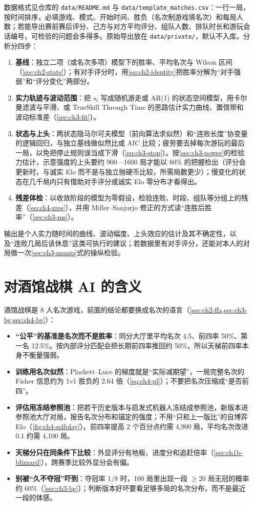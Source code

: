 数据格式见仓库的 \texttt{data/README.md} 与 \texttt{data/template\_matches.csv}：一行一局，按时间排序，必填游戏、模式、开始时间、胜负（名次制游戏填名次）和每局人数；若能导出赛前赛后评分、己方与对方平均评分、组队人数、排队时长和游玩会话编号，可检验的问题会多得多。原始导出放在 \texttt{data/private/}，默认不入库。分析分四步：
\begin{enumerate}
  \item \textbf{基线}：独立二项（或名次多项）模型下的胜率、平均名次与 Wilson 区间（\cref{sec:ch2-stats}）；有对手评分时，用\cref{eq:ch2-identity}把胜率分解为“对手强弱”和“评分变化”两部分。
  \item \textbf{实力轨迹与波动范围}：把 $s_t$ 写成随机游走或 AR(1) 的状态空间模型，用卡尔曼滤波与平滑、或 TrueSkill Through Time 的思路估计实力曲线、置信带和波动标准差（\cref{sec:ch3-fit}）。
  \item \textbf{状态与上头}：两状态隐马尔可夫模型（前向算法求似然）和“连败长度”协变量的逻辑回归，与独立基线做似然比或 AIC 比较；疲劳要去掉每次游玩的最后一局，以免把停止规则误当成下滑（\cref{eq:ch3-stop}）。按\cref{sec:ch3-power}的检验力估计，示意强度的上头要约 900—1600 局才能以 80\% 的把握检出（评分会更新时，与诚实 Elo 而不是与独立抛硬币比较，所需局数更少）；慢变化的状态在几千局内只有借助对手评分或诚实 Elo 零分布才看得出。
  \item \textbf{残差体检}：以收敛阶段的模型为零假设，检验连败、时段、组队等分组上的残差（\cref{eq:ch4-zres}），并用 Miller–Sanjurjo 修正的方式读“连胜后胜率”（\cref{sec:ch3-ms}）。
\end{enumerate}
输出是个人实力随时间的曲线、波动幅度、上头效应的估计及其不确定性，以及“连败几局后该休息”这类可执行的建议；若数据里有对手评分，还能对本人的对局做一次\cref{sec:ch3-manip}式的操纵检验。

\section*{对酒馆战棋 AI 的含义}

酒馆战棋是 8 人名次游戏，前面的结论都要换成名次的语言（\cref{sec:ch2-ffa,sec:ch3-bg,sec:ch4-bg}）：
\begin{itemize}
  \item \textbf{“公平”的基准是名次而不是胜率}：同分大厅里平均名次 4.5、前四率 50\%、第一名 12.5\%。按内部评分匹配会把长期前四率推回约 50\%，所以天梯前四率本身不衡量强弱。
  \item \textbf{训练用名次似然}：Plackett–Luce 的梯度就是“实际减期望”，一局完整名次的 Fisher 信息约为 1v1 胜负的 2.64 倍（\cref{eq:ch4-pl}）；不要把名次压缩成“是否前四”。
  \item \textbf{评估用冻结参照池}：把若干历史版本与启发式机器人冻结成参照池，新版本进参照池大厅对局，报告名次分布和锚定的强度；不用“只和上一版比”的自博弈 Elo（\cref{fig:ch4-selfplay}）。前四率提高 2 个百分点约需 4,900 局，平均名次改进 0.1 约需 4,100 局。
  \item \textbf{天梯分只在同条件下比较}：外显评分有地板、进度分和追赶倍率（\cref{sec:ch1b-blizzard}），跨赛季比较外显分会有偏。
  \item \textbf{别被“久不夺冠”吓到}：夺冠率 1/8 时，100 局里出现一段 $\ge20$ 局无冠的概率约 60\%（\cref{sec:ch3-bg}）；判断版本好坏要看足够多局的名次分布，而不是最近一段的体感。
\end{itemize}
